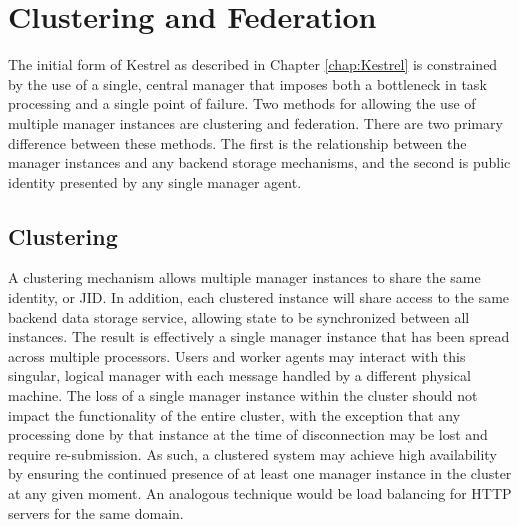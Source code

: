 \chapter{Clustering and Federation}
\label{chap:Clustering}

The initial form of Kestrel as described in Chapter \ref{chap:Kestrel} is
constrained by the use of a single, central manager that imposes both a
bottleneck in task processing and a single point of failure. Two methods for
allowing the use of multiple manager instances are clustering and federation.
There are two primary difference between these methods. The first is the
relationship between the manager instances and any backend storage mechanisms,
and the second is public identity presented by any single manager agent.

\section{Clustering}
A clustering mechanism allows multiple manager instances to share the same
identity, or JID. In addition, each clustered instance will share access to the
same backend data storage service, allowing state to be synchronized between all
instances. The result is effectively a single manager instance that has been
spread across multiple processors. Users and worker agents may interact with
this singular, logical manager with each message handled by a different physical
machine. The loss of a single manager instance within the cluster should not
impact the functionality of the entire cluster, with the exception that any
processing done by that instance at the time of disconnection may be lost and
require re-submission. As such, a clustered system may achieve high availability
by ensuring the continued presence of at least one manager instance in the
cluster at any given moment. An analogous technique would be load balancing for
HTTP servers for the same domain.

